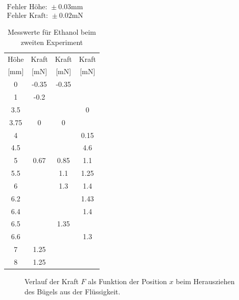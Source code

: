 \documentclass[11pt,a4paper]{article}
\begin{document}
\begin{table}[h]
\centering
$\begin{array}{l}
\textrm{Fehler Höhe: } \pm 0.03 \textrm{mm}\\
\textrm{Fehler Kraft: } \pm 0.02 \textrm{mN}
\end{array}$
\begin{tabular}{|c|c|c|c|}
\hline
\textrm{H\"ohe}& \textrm{Kraft} & \textrm{Kraft} & \textrm{Kraft} \\
\textrm{[mm]} & \textrm{[mN]}& \textrm{[mN]}& \textrm{[mN]} \\
\hline 
0 & -0.35 & -0.35 & \\
\hline
1 & -0.2 & & \\
\hline 
3.5 & & & 0\\
\hline 
3.75 & 0 & 0 & \\
\hline 
4 & & & 0.15\\ 
\hline
4.5 & & & 4.6\\ 
\hline
5 & 0.67 & 0.85 & 1.1\\ 
\hline
5.5 & & 1.1 & 1.25\\ 
\hline
6 & & 1.3 & 1.4\\ 
\hline 
6.2 & & & 1.43\\ 
\hline
6.4 & & & 1.4\\ 
\hline
6.5 & & 1.35 & \\ 
\hline
6.6 & & & 1.3\\ 
\hline
7 & 1.25 & & \\ 
\hline
8 & 1.25 & &\\
\hline
\end{tabular}
\caption{Messwerte für Ethanol beim zweiten Experiment}
\label{tabme}
\end{table}

\begin{figure}[p]
\centering
{}
\caption{Verlauf der Kraft $F$ als Funktion der Position $x$ beim Herausziehen des B\"ugels aus der Fl\"ussigkeit.}
\label{abbildung}
\end{figure}
\end{document}
